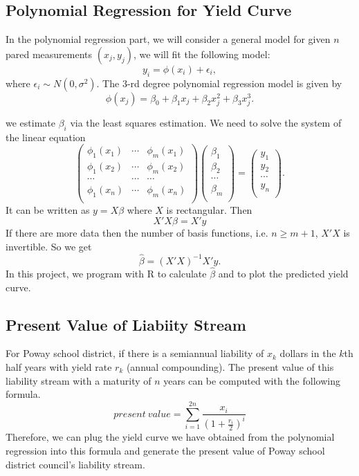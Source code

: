 \documentclass[oneside,12pt]{report}
\begin{document}
{\subsection{Polynomial Regression for Yield Curve}
In the polynomial regression part, we will consider a general model for given $n$ pared measurements $(x_j,y_j)$, we will fit the following model:
$$y_i=\phi(x_i) + \epsilon_i,$$
where $\epsilon_i \sim N(0,\sigma^2)$. 
 The 3-rd degree polynomial regression model is given by
$$\phi(x_j)= \beta_0 + \beta_1 x_j + \beta_2 x_j^2+ \beta_3 x_j^3.$$

\noindent we estimate $\beta_i$ via the least squares
estimation. We need to solve the system of the linear equation
$$ \left(%
\begin{array}{ccc}
  \phi_1(x_1)  &\cdots & \phi_m(x_1) \\
\phi_1(x_2)  &\cdots & \phi_m(x_2) \\
\cdots  & \cdots & \cdots\\
\phi_1(x_n)  &\cdots & \phi_m(x_n) \\
\end{array}\right)
\left(
\begin{array}{c}
  \beta_1 \\
  \beta_2\\
  \cdots\\
  \beta_m\\
\end{array}%
\right) = \left(%
\begin{array}{c}
  y_1 \\
  y_2\\
  \cdots\\
  y_n \\
\end{array}%
\right).$$ It can be written as $y = X\beta$ where $X$ is
rectangular. Then
$$X'X\beta = X'y$$
If there are more data then the number of basis functions, i.e. $n
\geq m+1$, $X'X$ is invertible. So we get
$$\hat \beta = (X'X)^{-1}X'y.$$
In this project, we program with R to calculate $\hat \beta$ and to plot the predicted yield curve.

\subsection{Present Value of Liabiity Stream}
For Poway school district, if there is a semiannual liability of $x_k$ dollars in the $k$th half years with yield rate $r_k$ (annual compounding). The present value of this liability stream with a maturity of $n$ years can be computed with the following formula.
$$ present~value=\sum_{i=1}^{2n} \frac{x_i}{(1+\frac{r_i}{2})^i} $$ 
Therefore, we can plug the yield curve we have obtained from the polynomial regression into this formula and generate the present value of Poway school district council's liability stream.\\

}
\end{document}
